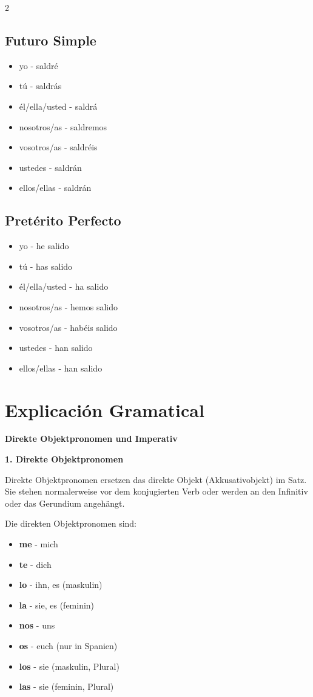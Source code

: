 \documentclass[12pt,a4paper]{article}
\begin{document}
\begin{multicols}{2}
\columnbreak

\subsection*{Futuro Simple}
\begin{itemize}[leftmargin=*]
    \item yo - saldré
    \item tú - saldrás
    \item él/ella/usted - saldrá
    \item nosotros/as - saldremos
    \item vosotros/as - saldréis
    \item ustedes - saldrán
    \item ellos/ellas - saldrán
\end{itemize}

\subsection*{Pretérito Perfecto}
\begin{itemize}[leftmargin=*]
    \item yo - he salido
    \item tú - has salido
    \item él/ella/usted - ha salido
    \item nosotros/as - hemos salido
    \item vosotros/as - habéis salido
    \item ustedes - han salido
    \item ellos/ellas - han salido
\end{itemize}

\end{multicols}

\newpage

\section*{Explicación Gramatical}

\textbf{Direkte Objektpronomen und Imperativ}

\textbf{1. Direkte Objektpronomen}

Direkte Objektpronomen ersetzen das direkte Objekt (Akkusativobjekt) im Satz. Sie stehen normalerweise vor dem konjugierten Verb oder werden an den Infinitiv oder das Gerundium angehängt.

Die direkten Objektpronomen sind:
\begin{itemize}[leftmargin=*]
    \item \textbf{me} - mich
    \item \textbf{te} - dich
    \item \textbf{lo} - ihn, es (maskulin)
    \item \textbf{la} - sie, es (feminin)
    \item \textbf{nos} - uns
    \item \textbf{os} - euch (nur in Spanien)
    \item \textbf{los} - sie (maskulin, Plural)
    \item \textbf{las} - sie (feminin, Plural)
\end{itemize}
\end{document}
